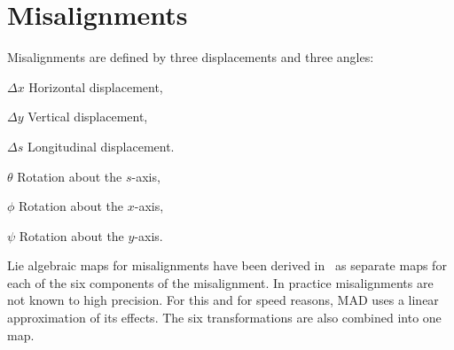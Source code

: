 \section{Misalignments}
\label{misalign}
Misalignments are defined by three displacements and three angles:
\begin{mylist}
\item[$\Delta x$]
Horizontal displacement,
\item[$\Delta y$]
Vertical displacement,
\item[$\Delta s$]
Longitudinal displacement.
\item[$\theta$]
Rotation about the $s$-axis,
\item[$\phi$]
Rotation about the $x$-axis,
\item[$\psi$]
Rotation about the $y$-axis.
\end{mylist}
Lie algebraic maps for misalignments have been derived in~\cite{HEA86}
as separate maps for each of the six components of the misalignment.
In practice misalignments are not known to high precision.
For this and for speed reasons,
MAD uses a linear approximation of its effects.
The six transformations are also combined into one map.
 
